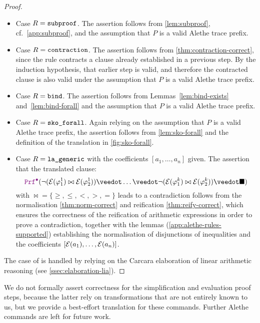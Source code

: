 \begin{proof}
\begin{itemize}
  \item Case $R = \texttt{\upshape{subproof}}$. The assertion follows from \cref{lem:subproof}, cf.\ \cref{app:subproof}, and the assumption that $P$ is a valid Alethe trace prefix.
  \item Case $R = \texttt{\upshape{contraction}}$.
    The assertion follows from \cref{thm:contraction-correct}, since the rule contracts a clause already established in a previous step. 
    By the induction hypothesis, that earlier step is valid, and therefore the contracted clause is also valid under the assumption that $P$ is a valid Alethe trace prefix.
  \item Case $R = \texttt{\upshape{bind}}$. The assertion follows from Lemmas~\ref{lem:bind-exists} and~\ref{lem:bind-forall} and the assumption that $P$ is a valid Alethe trace prefix.
  \item Case $R = \texttt{\upshape{sko\_forall}}$. Again relying on the assumption that $P$ is a valid Alethe trace prefix, the assertion follows from \cref{lem:sko-forall} and the definition of the translation in \cref{fig:sko-forall}.
  \item Case $R = \texttt{\upshape{la\_generic}}$ with the coefficients $[a_1 ,\dots, a_n]$ given. The assertion that the translated clause:
    \[
        \prfcl (\neg(\E{\varphi^1_1} \bowtie \E{\varphi^1_2}) \veedot \dots \veedot  \neg(\E{\varphi^k_1} \bowtie \E{\varphi^k_2}) \veedot \nil)
    \]
    with $\bowtie = \{ \geq, \leq, <, >, = \}$ leads to a contradiction follows from the normalisation \cref{thm:norm-correct} and reification \cref{thm:reify-correct}, which ensures the correctness of the reification of arithmetic expressions in order to prove a contradiction,
    together with the lemmas (\cref{app:alethe-rules-supported}) establishing the normalisation of disjunctions of inequalities and the coefficients $[\mathcal{E}(a_1) ,\dots, \mathcal{E}(a_n)]$. 
  \end{itemize}
    The case of  is handled by relying on the Carcara elaboration of linear arithmetic reasoning (see \cref{ssec:elaboration-lia}). 

\end{proof}

We do not formally assert correctness for the simplification and evaluation proof steps, because the latter rely on transformations that are not entirely known to us, but we provide a best-effort translation for these commands. Further Alethe commands are left for future work.
